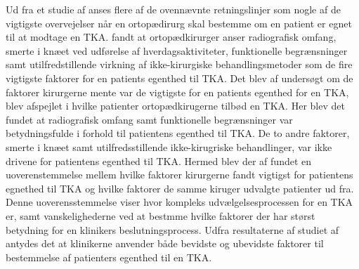 Ud fra et studie af \cite{skou2015} anses flere af de ovennævnte retningslinjer som nogle af de vigtigste overvejelser når en ortopædirurg skal bestemme om en patient er egnet til at modtage en TKA. \cite{skou2016} fandt at ortopædkirurger anser radiografisk omfang, smerte i knæet ved udførelse af hverdagsaktiviteter, funktionelle begrænsninger samt utilfredstillende virkning af ikke-kirurgiske behandlingsmetoder som de fire vigtigste faktorer for en patients egenthed til TKA. Det blev af \cite{skou2016} undersøgt om de faktorer kirurgerne mente var de vigtigste for en patients egenthed for en TKA, blev afspejlet i hvilke patienter ortopædkirugerne tilbød en TKA. Her blev det fundet at radiografisk omfang samt funktionelle begrænsninger var betydningsfulde i forhold til patientens egenthed til TKA. De to andre faktorer, smerte i knæet samt utilfredsstillende ikke-kirugriske behandlinger, var ikke drivene for patientens egenthed til TKA. Hermed blev der af \cite{skou2015} fundet en uoverenstemmelse mellem hvilke faktorer kirurgerne fandt vigtigst for patientens egnethed til TKA og hvilke faktorer de samme kiruger udvalgte patienter ud fra. Denne uoverensstemmelse viser hvor kompleks udvælgelsesprocessen for en TKA er, samt vanskelighederne ved at bestmme hvilke faktorer der har størst betydning for en klinikers beslutningsprocess. Udfra resultaterne af studiet af \cite{skou2016} antydes det at klinikerne anvender både bevidste og ubevidste faktorer til bestemmelse af patienters egenthed til en TKA.    
    

